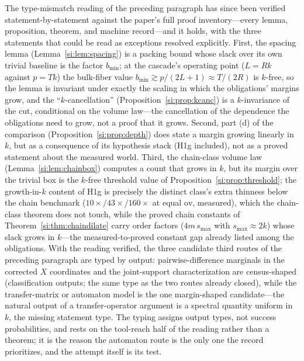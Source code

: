 The type-mismatch reading of the preceding paragraph has since been
verified statement-by-statement against the paper's full proof
inventory---every lemma, proposition, theorem, and machine record---and
it holds, with the three statements that could be read as exceptions
resolved explicitly. First, the spacing lemma (Lemma~\ref{si:lem:spacing})
is a packing bound whose slack over its own trivial baseline is the
factor $b_{\min}$; at the cascade's operating point ($L=Rk$ against
$p=Tk$) the bulk-fiber value $b_{\min}\gtrsim p/(2L+1)\approx T/(2R)$ is
$k$-free, so the lemma is invariant under exactly the scaling in which
the obligations' margins grow, and the ``$k$-cancellation''
(Proposition~\ref{si:prop:kcanc}) is a $k$-invariance of the cut,
conditional on the volume law---the cancellation of the dependence the
obligations need to grow, not a proof that it grows. Second, part (d) of
the comparison (Proposition~\ref{si:prop:depth}) does state a margin
growing linearly in $k$, but as a consequence of its hypothesis stack
(H1g included), not as a proved statement about the measured world.
Third, the chain-class volume law (Lemma~\ref{si:lem:chainbox}) computes a
count that grows in $k$, but its margin over the trivial box is the
$k$-free threshold value of Proposition~\ref{si:prop:threshold}; the
growth-in-$k$ content of H1g is precisely the distinct class's extra
thinness below the chain benchmark ($10\times/43\times/160\times$ at
equal $\mathrm{ov}$, measured), which the chain-class theorem does not
touch, while the proved chain constants of Theorem~\ref{si:thm:chaindilate}
carry order factors ($4m\,s_{\max}$ with $s_{\max}\approx2k$) whose
slack grows in $k$---the measured-to-proved constant gap already listed
among the obligations. With the reading verified, the three candidate
third routes of the preceding paragraph are typed by output:
pairwise-difference marginals in the corrected $X$ coordinates and the
joint-support characterization are census-shaped (classification
outputs; the same type as the two routes already closed), while the
transfer-matrix or automaton model is the one margin-shaped
candidate---the natural output of a transfer-operator argument is a
spectral quantity uniform in $k$, the missing statement type. The typing
assigns output types, not success probabilities, and rests on the
tool-reach half of the reading rather than a theorem; it is the reason
the automaton route is the only one the record prioritizes, and the
attempt itself is its test.

